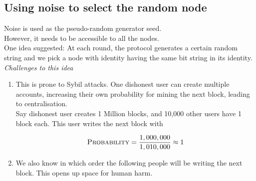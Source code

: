 \documentclass[10pt,a4paper]{article}
\begin{document}
\subsection{Using noise to select the random node}
Noise is used as the pseudo-random generator seed.\\
However, it needs to be accessible to all the nodes.\\
One idea suggested: At each round, the protocol generates a certain random string and we pick a node with identity having the same bit string in its identity.\\
\emph{Challenges to this idea}
\begin{enumerate}
\item This is prone to Sybil attacks. One dishonest user can create multiple accounts, increasing their own probability for mining the next block, leading to centralisation.\\

Say dishonest user creates 1 Million blocks, and 10,000 other users have 1 block each. This user writes the next block with
\begin{center}
$$ \textsc{Probability} = \frac{1,000,000}{1,010,000}
 \approx 1 $$
\end{center}

\item We also know in which order the following people will be writing the next block. This opens up space for human harm.

\end{enumerate}
\end{document}
